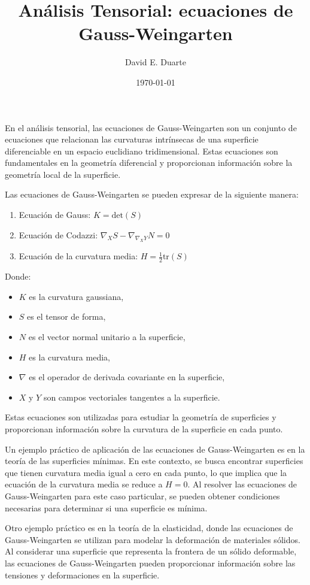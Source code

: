 \documentclass{article}
\title{Análisis Tensorial: ecuaciones de Gauss-Weingarten}
\author{David E. Duarte}
\date{\today}
\begin{document}
	\maketitle
	
	En el análisis tensorial, las ecuaciones de Gauss-Weingarten son un conjunto de ecuaciones que relacionan las curvaturas intrínsecas de una superficie diferenciable en un espacio euclidiano tridimensional. Estas ecuaciones son fundamentales en la geometría diferencial y proporcionan información sobre la geometría local de la superficie.
	
	Las ecuaciones de Gauss-Weingarten se pueden expresar de la siguiente manera:
	
	\begin{enumerate}
		\item Ecuación de Gauss: $K = \text{det}(S)$
		\item Ecuación de Codazzi: $\nabla_X S - \nabla_{\nabla_X Y} N = 0$
		\item Ecuación de la curvatura media: $H = \frac{1}{2} \text{tr}(S)$
	\end{enumerate}
	
	Donde:
	\begin{itemize}
		\item $K$ es la curvatura gaussiana,
		\item $S$ es el tensor de forma,
		\item $N$ es el vector normal unitario a la superficie,
		\item $H$ es la curvatura media,
		\item $\nabla$ es el operador de derivada covariante en la superficie,
		\item $X$ y $Y$ son campos vectoriales tangentes a la superficie.
	\end{itemize}
	
	Estas ecuaciones son utilizadas para estudiar la geometría de superficies y proporcionan información sobre la curvatura de la superficie en cada punto.
	
	Un ejemplo práctico de aplicación de las ecuaciones de Gauss-Weingarten es en la teoría de las superficies mínimas. En este contexto, se busca encontrar superficies que tienen curvatura media igual a cero en cada punto, lo que implica que la ecuación de la curvatura media se reduce a $H = 0$. Al resolver las ecuaciones de Gauss-Weingarten para este caso particular, se pueden obtener condiciones necesarias para determinar si una superficie es mínima.
	
	Otro ejemplo práctico es en la teoría de la elasticidad, donde las ecuaciones de Gauss-Weingarten se utilizan para modelar la deformación de materiales sólidos. Al considerar una superficie que representa la frontera de un sólido deformable, las ecuaciones de Gauss-Weingarten pueden proporcionar información sobre las tensiones y deformaciones en la superficie.
	
\end{document}
